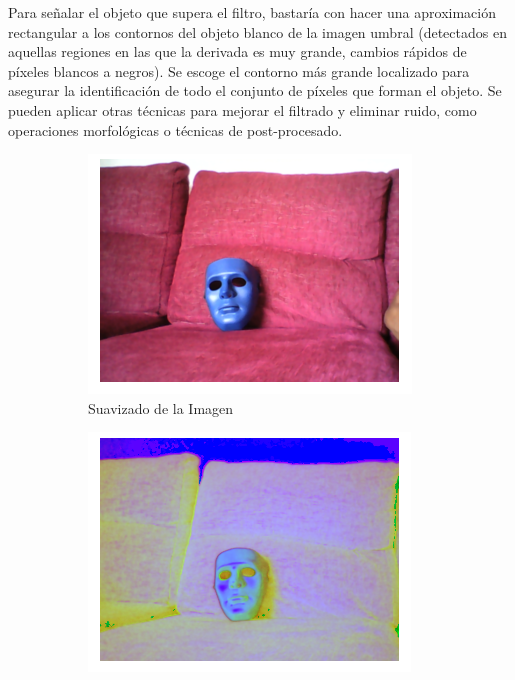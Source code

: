 Para señalar el objeto que supera el filtro, bastaría con hacer una aproximación rectangular a los contornos del objeto blanco de la imagen umbral (detectados en aquellas regiones en las que la derivada es muy grande, cambios rápidos de píxeles blancos a negros). Se escoge el contorno más grande localizado para asegurar la identificación de todo el conjunto de píxeles que forman el objeto. Se pueden aplicar otras técnicas para mejorar el filtrado y eliminar ruido, como operaciones morfológicas o técnicas de post-procesado.
\begin{figure}
\centering
\begin{subfigure}{.32\textwidth}
  \centering
  \includegraphics[width=.95\linewidth]{figures/cf_smooth.png}
  \caption{Suavizado de la Imagen}
  \label{smooth}
\end{subfigure}
\begin{subfigure}{.32\textwidth}
  \centering
  \includegraphics[width=.95\linewidth]{figures/cf_hsv.png}

\end{subfigure}
\end{figure}
